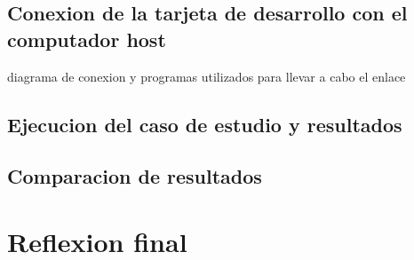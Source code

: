\subsection{Conexion de la tarjeta de desarrollo con el computador host}
diagrama de conexion y programas utilizados para llevar a cabo el enlace

\subsection{Ejecucion del caso de estudio y resultados}

\subsection{Comparacion de resultados}

\section{Reflexion final}